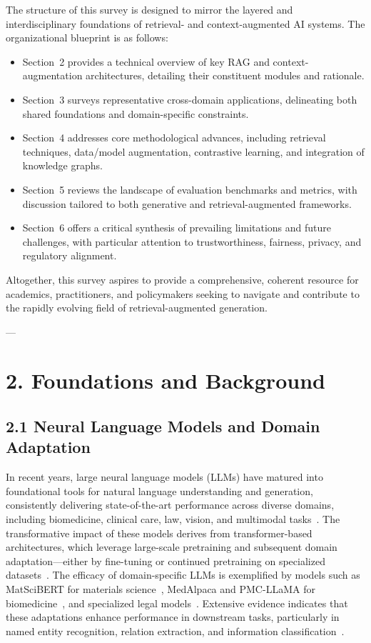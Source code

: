 \documentclass[11pt]{article}
\begin{document}
The structure of this survey is designed to mirror the layered and interdisciplinary foundations of retrieval- and context-augmented AI systems. The organizational blueprint is as follows:
\begin{itemize}
    \item Section~2 provides a technical overview of key RAG and context-augmentation architectures, detailing their constituent modules and rationale.
    \item Section~3 surveys representative cross-domain applications, delineating both shared foundations and domain-specific constraints.
    \item Section~4 addresses core methodological advances, including retrieval techniques, data/model augmentation, contrastive learning, and integration of knowledge graphs.
    \item Section~5 reviews the landscape of evaluation benchmarks and metrics, with discussion tailored to both generative and retrieval-augmented frameworks.
    \item Section~6 offers a critical synthesis of prevailing limitations and future challenges, with particular attention to trustworthiness, fairness, privacy, and regulatory alignment.
\end{itemize}
Altogether, this survey aspires to provide a comprehensive, coherent resource for academics, practitioners, and policymakers seeking to navigate and contribute to the rapidly evolving field of retrieval-augmented generation.

---
\section{2. Foundations and Background}

\subsection{2.1 Neural Language Models and Domain Adaptation}

In recent years, large neural language models (LLMs) have matured into foundational tools for natural language understanding and generation, consistently delivering state-of-the-art performance across diverse domains, including biomedicine, clinical care, law, vision, and multimodal tasks~\cite{ref1,ref2,ref3,ref6,ref7,ref8,ref29,ref31,ref42,ref48,ref52,ref63}. The transformative impact of these models derives from transformer-based architectures, which leverage large-scale pretraining and subsequent domain adaptation—either by fine-tuning or continued pretraining on specialized datasets~\cite{ref6,ref31,ref63}. The efficacy of domain-specific LLMs is exemplified by models such as MatSciBERT for materials science~\cite{ref29}, MedAlpaca and PMC-LLaMA for biomedicine~\cite{ref3,ref31,ref48}, and specialized legal models~\cite{ref8}. Extensive evidence indicates that these adaptations enhance performance in downstream tasks, particularly in named entity recognition, relation extraction, and information classification~\cite{ref3,ref29,ref31,ref42,ref48}.
\end{document}
